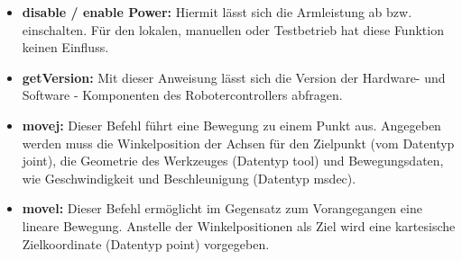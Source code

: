 \documentclass[ a4paper,
                oneside,
                toc=bibliography,
                toc=listof
                ]{scrbook}
\begin{document}
   	\begin{itemize}
   		\item \textbf{disable / enable Power:} Hiermit lässt sich die Armleistung ab bzw. einschalten. Für den lokalen, manuellen oder Testbetrieb hat diese Funktion keinen Einfluss.
   		\item \textbf{getVersion:} Mit dieser Anweisung lässt sich die Version der Hardware- und Software - Komponenten des Robotercontrollers abfragen.
   		\item \textbf{movej:} Dieser Befehl führt eine Bewegung zu einem Punkt aus. Angegeben werden muss die Winkelposition der Achsen für den Zielpunkt (vom Datentyp \glqq joint\grqq), die Geometrie des Werkzeuges (Datentyp \glqq tool\grqq) und Bewegungsdaten, wie Geschwindigkeit und Beschleunigung (Datentyp \glqq msdec\grqq).
   		\item \textbf{movel:} Dieser Befehl ermöglicht im Gegensatz zum Vorangegangen eine lineare Bewegung. Anstelle der Winkelpositionen als Ziel wird eine kartesische Zielkoordinate (Datentyp \glqq point\grqq) vorgegeben.  \\
   	\end{itemize}
\end{document}
